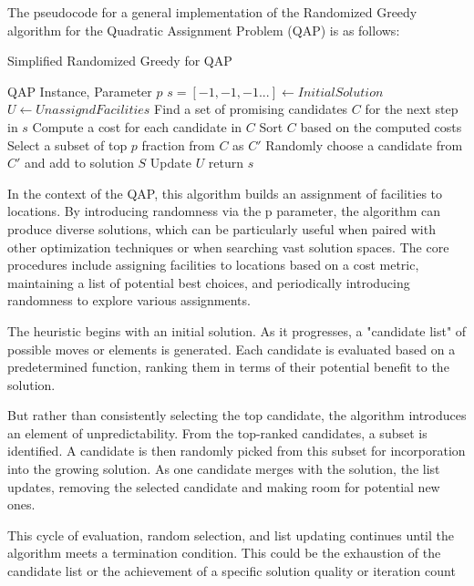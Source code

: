 \documentclass[a4paper,10pt]{article}
\begin{document}
The pseudocode for a general implementation of the Randomized Greedy algorithm for the Quadratic Assignment Problem (QAP) is as follows:

\begin{algorithm}
\caption{Simplified Randomized Greedy for QAP}\label{alg:very_simple_rg_qap}
\begin{algorithmic}
\Require QAP Instance, Parameter $p$ 
\State $s = [-1,-1,-1...] \gets InitialSolution$
\State $U \gets UnassigndFacilities$
    \State Find a set of promising candidates $C$ for the next step in $s$
    \State Compute a cost for each candidate in $C$
    \State Sort $C$ based on the computed costs
    \State Select a subset of top $p$ fraction from $C$ as $C'$
    \State Randomly choose a candidate from $C'$ and add to solution $S$
    \State Update $U$
\EndWhile
\State return $s$
\end{algorithmic}
\end{algorithm}

In the context of the QAP, this algorithm builds an assignment of facilities to locations. By introducing randomness via the p parameter, the algorithm can produce diverse solutions, which can be particularly useful when paired with other optimization techniques or when searching vast solution spaces. The core procedures include assigning facilities to locations based on a cost metric, maintaining a list of potential best choices, and periodically introducing randomness to explore various assignments.

The heuristic begins with an initial solution. As it progresses, a "candidate list" of possible moves or elements is generated. Each candidate is evaluated based on a predetermined function, ranking them in terms of their potential benefit to the solution.

But rather than consistently selecting the top candidate, the algorithm introduces an element of unpredictability. From the top-ranked candidates, a subset is identified. A candidate is then randomly picked from this subset for incorporation into the growing solution. As one candidate merges with the solution, the list updates, removing the selected candidate and making room for potential new ones.

This cycle of evaluation, random selection, and list updating continues until the algorithm meets a termination condition. This could be the exhaustion of the candidate list or the achievement of a specific solution quality or iteration count
\end{document}
